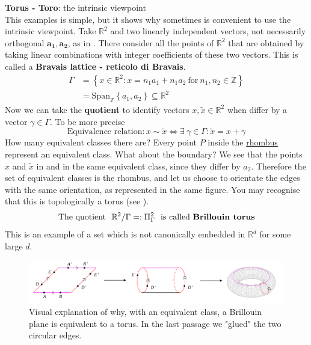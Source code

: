 \documentclass[../main.tex]{subfiles}
\begin{document}
\begin{example}
\textbf{Torus - Toro}: the intrinsic viewpoint\\
This examples is simple, but it shows why sometimes is convenient to use the intrinsic viewpoint. Take $\mathbb{R}^2$ and two linearly independent vectors, not necessarily orthogonal $\mathbf{a_1},\mathbf{a_2}$, as in . There consider all the points of $\mathbb{R}^2$ that are obtained by taking linear combinations with integer coefficients of these two vectors. This is called a \textbf{Bravais lattice - reticolo di Bravais}.
\[
\begin{split}
    \Gamma 
    &= \left\{x\in \mathbb{R}^2: x = n_1a_1+n_1a_2 \ \textrm{for} \ n_1,n_2\in \mathbb{Z}\right\}\\
    &=\textrm{Span}_{\mathbb{Z}}\left\{a_1,a_2\right\}\subseteq\mathbb{R}^2
\end{split}
\]
Now we can take the \textbf{quotient} to identify vectors $x,\tilde{x}\in\mathbb{R}^2$ when differ by a vector $\gamma\in\Gamma$. To be more precise
\[
\textrm{Equivalence relation}: x\sim \tilde{x} \Leftrightarrow \exists \ \gamma \in \Gamma: \tilde{x}=x+\gamma
\]
How many equivalent classes there are? Every point $P$ inside the \href{https://it.wikipedia.org/wiki/Rombo_(geometria)}{rhombus} represent an equivalent class. What about the boundary? We see that the points $x$ and $\tilde{x}$ in  and in the same equivalent class, since they differ by $a_2$. Therefore the set of equivalent classes is the rhombus, and let us choose to orientate the edges with the same orientation, as represented in the same figure. You may recognise that this is topologically a torus (see ).
\[
\textrm{The quotient }\  \mathbb{R}^2/\Gamma =: \Pi^2_{\Gamma} \ \textrm{ is called \textbf{Brillouin torus}}
\]
This is an example of a set which is not canonically embedded in $\mathbb{R}^d$ for some large $d$. 
\end{example}
\begin{figure}[h!]
	\includegraphics{images/construction_torus.pdf}
	\caption[How to construct a torus]{Visual explanation of why, with an equivalent class, a Brillouin plane is equivalent to a torus. In the last passage we "glued" the two circular edges.}
\end{figure}
\end{document}
